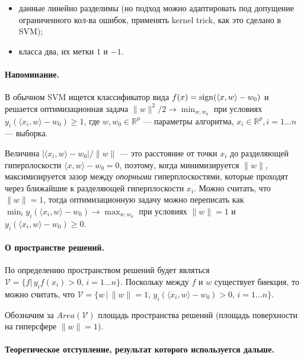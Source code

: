 \documentclass[specialist, 12pt, href]{article}
\begin{document}
\begin{itemize}
\item
  данные линейно разделимы (но подход можно адаптировать под допущение
  ограниченного кол-ва ошибок, применять kernel trick, как это сделано в
  SVM);
\item
  класса два, их метки \(1\) и \(-1\).
\end{itemize}

\paragraph{Напоминание.}

В обычном SVM ищется классификатор вида
\(f(x) = {\rm sign}(\langle x, w \rangle - w_0)\) и решается
оптимизационная задача \(\|w\|^2/2 \to \min_{w, w_0}\) при условиях
\(y_i(\langle x_i, w \rangle - w_0) \geq 1\), где \(w, w_0 \in \mathbb{R}^p\) ---
параметры алгоритма, \(x_i \in \mathbb{R}^p, i = 1\ldots n\) --- выборка.

Величина \(|\langle x_i, w \rangle - w_0|/\|w\|\) --- это расстояние от
точки \(x_i\) до разделяющей гиперплоскости
\(\langle x, w \rangle - w_0 = 0\), поэтому, когда минимизируется
\(\|w\|\), максимизируется зазор между \emph{опорными} гиперплоскостями,
которые проходят через ближайшие к разделяющей гиперплоскости \(x_i\).
Можно считать, что \(\|w\| = 1\), тогда оптимизационную задачу можно
переписать как
\(\min_i y_i (\langle x_i, w \rangle - w_0) \to \max_{w, w_0}\) при
условиях \(\|w\| = 1\) и \(y_i(\langle x_i, w \rangle - w_0) \geq 0\).

\paragraph{О пространстве
решений.}

По определению пространством решений будет являться
\(\mathcal{V} = \{f |\, y_if(x_i) > 0,\, i = 1 \ldots n\}\). Поскольку
между \(f\) и \(w\) существует биекция, то можно считать, что
\(\mathcal{V} = \{w\,|\, \|w\| = 1,\, y_i (\langle x_i, w \rangle - w_0) > 0,\, i = 1\ldots n \}\).

Обозначим за \(Area(\mathcal{V})\) площадь пространства решений (площадь поверхности на гиперсфере \(\|w\| = 1\)).

\paragraph{Теоретическое отступление, результат которого используется
дальше.}
\end{document}
